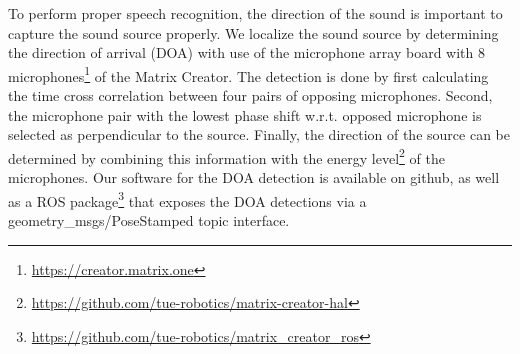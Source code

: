 To perform proper speech recognition, the direction of the sound is important to capture the sound source properly. We localize the sound source by determining the direction of arrival (DOA) with use of the microphone array board with 8 microphones\footnote{\url{https://creator.matrix.one}} of the Matrix Creator.
The detection is done by first calculating the time cross correlation between four pairs of opposing microphones. Second, the microphone pair with the lowest phase shift w.r.t. opposed microphone is selected as perpendicular to the source. Finally, the direction of the source can be determined by combining this information with the energy level\footnote{\url{https://github.com/tue-robotics/matrix-creator-hal}} of the microphones. Our software for the DOA detection is available on github, as well as a ROS package\footnote{\url{https://github.com/tue-robotics/matrix_creator_ros}} that exposes the DOA detections via a geometry\_msgs/PoseStamped topic interface.